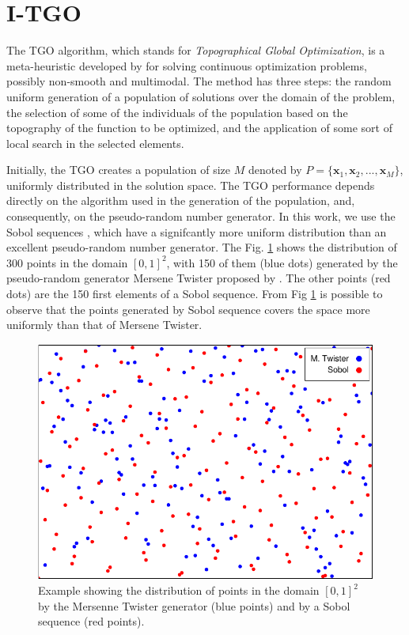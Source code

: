 \section{I-TGO}\label{sec:Methods}

The TGO algorithm, which stands for \textit{Topographical Global Optimization}, is a meta-heuristic developed by \cite{ITGO1} for solving continuous optimization problems, possibly non-smooth and multimodal. The method has three steps: the random uniform generation of a population of solutions over the domain of the problem, the selection of some of the individuals of the population based on the topography of the function to be optimized, and the application of some sort of local search in the selected elements.


Initially, the TGO creates a population of size $M$ denoted by $P = \{\bm{x}_1, \bm{x}_2, ..., \allowbreak \bm{x}_M\}$, uniformly distributed in the solution space. The TGO performance depends directly on the algorithm used in the generation of the population, and, consequently, on the pseudo-random number generator. In this work, we use the Sobol sequences \cite{Sobol, ITGO3}, which have a signifcantly more uniform distribution than an excellent pseudo-random number generator. The Fig. \ref{fig:Sobol} shows the distribution of 300 points in the domain $[0, 1]^2$, with 150 of them (blue dots) generated by the pseudo-random generator Mersene Twister proposed by \cite{mt19937}. The other points (red dots) are the 150 first elements of a Sobol sequence. From Fig \ref{fig:Sobol} is possible to observe that the points generated by Sobol sequence covers the space more uniformly than that of Mersene Twister.


\begin{figure}[h]
\begin{center}
\includegraphics[scale=0.8]{scatter-crop.pdf}
\end{center}
\captionsetup{justification=centering}
\caption{Example showing the distribution of points in the domain $[0, 1]^2$ by the Mersenne Twister generator (blue points) and by a Sobol sequence (red points). }\label{fig:Sobol}
\end{figure}


